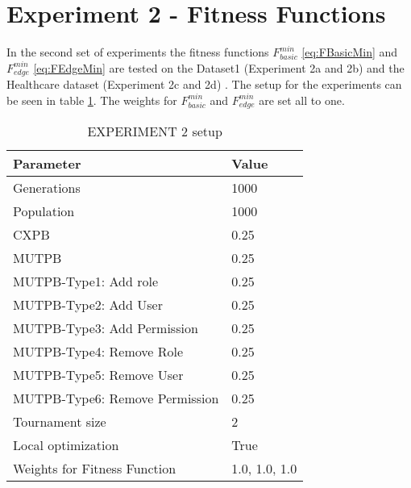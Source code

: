 \section{Experiment 2 - Fitness Functions}
\label{sec:exp2}
In the second set of experiments the fitness functions $F_{basic}^{min}$ \eqref{eq:FBasicMin} and $F_{edge}^{min}$ \eqref{eq:FEdgeMin} are tested on the Dataset1 (Experiment 2a and 2b) and the Healthcare dataset (Experiment 2c and 2d) . The setup for the experiments can be seen in table \ref{tab:exp2_setup}. The weights for $F_{basic}^{min}$ and $F_{edge}^{min}$ are set all to one.

\begin{table}[H]
    \centering
    \begin{adjustbox}{width=0.5\textwidth}
	    \begin{tabular}{|l|l|}
	        \hline
	        \rowcolor{myGray} 
	        \textbf{Parameter}              & \textbf{Value}    \\ \hline
	        Generations                     & 1000              \\ \hline
	        Population                      & 1000              \\ \hline
	        CXPB                            & 0.25              \\ \hline
	        MUTPB                           & 0.25              \\ \hline
	        MUTPB-Type1: Add role           & 0.25              \\ \hline
	        MUTPB-Type2: Add User           & 0.25              \\ \hline
	        MUTPB-Type3: Add Permission     & 0.25              \\ \hline
	        MUTPB-Type4: Remove Role        & 0.25              \\ \hline
	        MUTPB-Type5: Remove User        & 0.25              \\ \hline
	        MUTPB-Type6: Remove Permission  & 0.25              \\ \hline
	        Tournament size                 & 2                 \\ \hline
	        Local optimization              & True              \\ \hline
	        Weights for Fitness Function    & 1.0, 1.0, 1.0     \\ \hline
	    \end{tabular}
	\end{adjustbox}
    \caption{EXPERIMENT 2 setup}
    \label{tab:exp2_setup}
\end{table}

